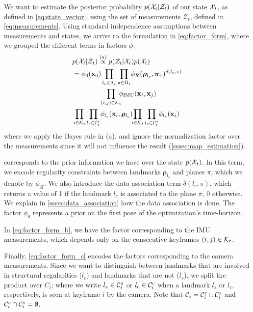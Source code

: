 We want to estimate the posterior probability $p(\calX_t|\mathcal{Z}_t)$ of our state $\calX_t$, as defined in \cref{eq:state_vector}, using the set of measurements $\mathcal{Z}_t$, defined in \cref{eq:measurements}.
Using standard independence assumptions between measurements and states, we arrive to the formulation in \cref{eq:factor_form}, where we grouped the different terms in factors $\phi$:
\begin{subequations}\label{eq:factor_form}
  \begin{align}
    &p(\calX_t|\mathcal{Z}_t) \overset{(a)}{\propto} p(\mathcal{Z}_t|\calX_t)p(\calX_t) \nonumber\\
    &= \phi_0(\mathbf{x}_0)\prod_{l_c\in\Lambda_t}\prod_{\pi\in\Pi_t}\!\phi_{\mathcal{R}}(\bm{\rho}_{l_c}, \bm\pi_\pi)^{\delta(l_c, \pi)} \label{eq:factor_form_a}\\
    &\quad\quad\quad\quad\prod_{(i,j)\in\calK_t}\!\!\!\phi_{\text{IMU}}(\mathbf{x}_i, \mathbf{x}_j) \label{eq:factor_form_b}\\
    &\prod_{i\in\calK_t}\prod_{l_c\in\meascam_i^c}\!\phi_{l_c}(\mathbf{x}_i, \bm{\rho}_{l_c}) \!\!\prod_{i\in\calK_t}\prod_{l_s\in\meascam_i^s}\!\phi_{l_s}(\mathbf{x}_i) \label{eq:factor_form_c}
  \end{align}
\end{subequations}
where we apply the Bayes rule in (a), and ignore the normalization factor over the measurements since it will not influence the result (\cref{sssec:map_estimation}).

 corresponds to the prior information we have over the state $p(\calX_t)$.
In this term, we encode regularity constraints between landmarks $\bm\rho_{l_c}$ and planes $\pi$, which we denote by $\phi_{\mathcal{R}}$.
We also introduce the data association term $\delta(l_c, \pi)$, which returns a value of 1 if the landmark $l_c$ is associated to the plane $\pi$, 0 otherwise.
We explain in \cref{sssec:data_association} how the data association is done.
The factor $\phi_0$ represents a prior on the first pose of the optimization's time-horizon.

In \cref{eq:factor_form_b}, we have the factor corresponding to the IMU measurements, which depends only on the consecutive keyframes $(i, j)\in\calK_t$.

Finally, \cref{eq:factor_form_c} encodes the factors corresponding to the camera measurements.
Since we want to distinguish between landmarks that are involved in structural regularities ($l_c$) and landmarks that are not ($l_s$), we split the product over $C_i$;
where we write $l_s\in \mathcal{C}_i^s$ or $l_c\in \mathcal{C}_i^c$ when a landmark $l_s$ or $l_c$, respectively, is seen at keyframe $i$ by the camera. Note that $\mathcal{C}_i = \mathcal{C}_i^c \cup \mathcal{C}_i^s$ and $\mathcal{C}_i^c \cap \mathcal{C}_i^s = \emptyset$.

